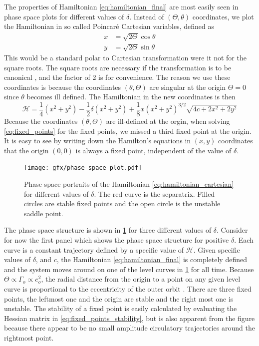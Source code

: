 \documentclass[twoside,openright,titlepage,numbers=noenddot,headinclude,%
                footinclude=true,cleardoublepage=empty,abstractoff, 
                BCOR=5mm,paper=a4,fontsize=11pt,%
                american,%
                ]{scrreprt}%
\begin{document}
The properties of Hamiltonian \ref{eq:hamiltonian_final} are most easily seen
in phase space plots for different values of $\delta$. Instead of $(\Theta,\theta)$ 
coordinates, we plot the Hamiltonian
in so called Poincaré Cartesian variables, defined as 
\begin{equation}
    \begin{aligned}
        x&=\sqrt{2\Theta}\cos\theta\\
        y&=\sqrt{2\Theta}\sin\theta
    \end{aligned}
\end{equation}
This would be a standard polar to Cartesian transformation were it not for the 
square roots. The square roots are necessary if the transformation is to be 
canonical \citep{sylvio}, and the factor of 2 is for convenience. The reason
we use these coordinates is because the coordinates $(\theta,\Theta)$ are
singular at the origin $\Theta=0$ since $\theta$ becomes ill defined. 
The Hamiltonian in the new coordinates is then
\begin{equation}
    \mathcal{H}= \frac{1}{4}\left( x^2+y^2\right) - \frac{1}{2}\delta\left(
    x^2+y^2\right)+ \frac{1}{8} x\left(x^2+y^2\right)^{3/2}\sqrt{4c+2x^2+2y^2}
    \label{eq:hamiltonian_cartesian}
\end{equation}
Because the coordinates $(\theta,\Theta)$ are ill-defined at the orgin, when
solving \cref{eq:fixed_points} for the fixed points, we missed a third fixed 
point at the origin. It is easy to see by writing down the Hamilton's
equations in $(x,y)$ coordinates that the origin $(0,0)$ is always a fixed
point, independent of the value of $\delta$.
\begin{figure}
\centering
\texttt{[image: gfx/phase\_space\_plot.pdf]}
    \caption[Phase space portraits of the Hamiltonian.]{Phase space 
    portraits of the Hamiltonian 
    \ref{eq:hamiltonian_cartesian} for different values of 
    $\delta$. The red curve
    is the separatrix. Filled circles are stable fixed points and the open
    circle is the unstable saddle point.}
\label{fig:phase_space}
\end{figure}

The phase space structure is shown in \cref{fig:phase_space} for three different
values of $\delta$. Consider for now the first panel which shows the phase space
structure for positive $\delta$. Each curve is a constant trajectory defined by a specific value
of $\mathcal{H}$. Given specific values of $\delta$, and $c$, the Hamiltonian 
\ref{eq:hamiltonian_final} is completely defined and the system moves around on
one of the level curves in \cref{fig:phase_space} for all time. 
Because $\Theta\propto \Gamma_o\propto e_o^2$, the radial distance
from the origin to a point on any given level curve is proportional to the eccentricity
of the outer orbit . There are three fixed points, the
leftmost one and the origin are stable and the right most one is unstable. The 
stability of a fixed point is easily calculated by evaluating the Hessian matrix in
\cref{eq:fixed_points_stability}, but is also apparent from the figure because there
appear to be no small amplitude circulatory trajectories around the rightmost point. 
\end{document}
